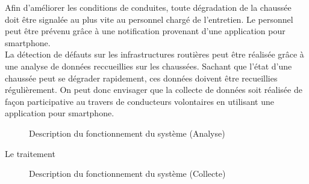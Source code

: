 Afin d'améliorer les conditions de conduites, toute dégradation de la chaussée
doit être signalée au plus vite au personnel chargé de l'entretien. Le
personnel peut être prévenu grâce à une notification provenant d'une
application pour smartphone.\\

La détection de défauts sur les infrastructures routières peut être réalisée
grâce à une analyse de données reccueillies sur les chaussées. Sachant que
l'état d'une chaussée peut se dégrader rapidement, ces données doivent être
recueillies régulièrement. On peut donc envisager que la collecte de données
soit réalisée de façon participative au travers de conducteurs volontaires en
utilisant une application pour smartphone.\\

\begin{figure}[H]
    \centering
    \caption{Description du fonctionnement du système (Analyse)}
    \label{analyse}
\end{figure}

Le traitement

\begin{figure}[H]
    \centering
    \caption{Description du fonctionnement du système (Collecte)}
    \label{collecte}
\end{figure}